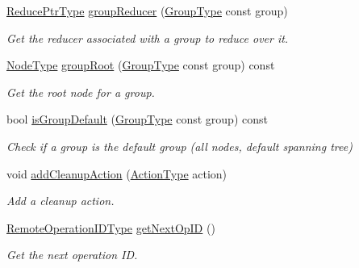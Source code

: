 \begin{DoxyCompactItemize}
\item 
\hyperlink{structvt_1_1group_1_1_group_manager_a0c646983506b624ad93ceb127df9e811}{Reduce\+Ptr\+Type} \hyperlink{structvt_1_1group_1_1_group_manager_a3234e5be55c32ccfb56785265e26b4c6}{group\+Reducer} (\hyperlink{namespacevt_a27b5e4411c9b6140c49100e050e2f743}{Group\+Type} const group)
\begin{DoxyCompactList}\small\item\em Get the reducer associated with a group to reduce over it. \end{DoxyCompactList}\item 
\hyperlink{namespacevt_a866da9d0efc19c0a1ce79e9e492f47e2}{Node\+Type} \hyperlink{structvt_1_1group_1_1_group_manager_ab5b8178a37165903c73f9159c9259cf5}{group\+Root} (\hyperlink{namespacevt_a27b5e4411c9b6140c49100e050e2f743}{Group\+Type} const group) const
\begin{DoxyCompactList}\small\item\em Get the root node for a group. \end{DoxyCompactList}\item 
bool \hyperlink{structvt_1_1group_1_1_group_manager_ad4d55f7bcf2aadd97c858b3f11c5d365}{is\+Group\+Default} (\hyperlink{namespacevt_a27b5e4411c9b6140c49100e050e2f743}{Group\+Type} const group) const
\begin{DoxyCompactList}\small\item\em Check if a group is the default group (all nodes, default spanning tree) \end{DoxyCompactList}\item 
void \hyperlink{structvt_1_1group_1_1_group_manager_a79edddb814a77d2ff45fea14291e95df}{add\+Cleanup\+Action} (\hyperlink{namespacevt_ae0a5a7b18cc99d7b732cb4d44f46b0f3}{Action\+Type} action)
\begin{DoxyCompactList}\small\item\em Add a cleanup action. \end{DoxyCompactList}\item 
\hyperlink{namespacevt_1_1group_a73f2624ddeb535b39a08b6524f26b244}{Remote\+Operation\+I\+D\+Type} \hyperlink{structvt_1_1group_1_1_group_manager_a472e95d136ef71c14ac5b4c931ff79b9}{get\+Next\+Op\+ID} ()
\begin{DoxyCompactList}\small\item\em Get the next operation ID. \end{DoxyCompactList}\end{DoxyCompactItemize}
